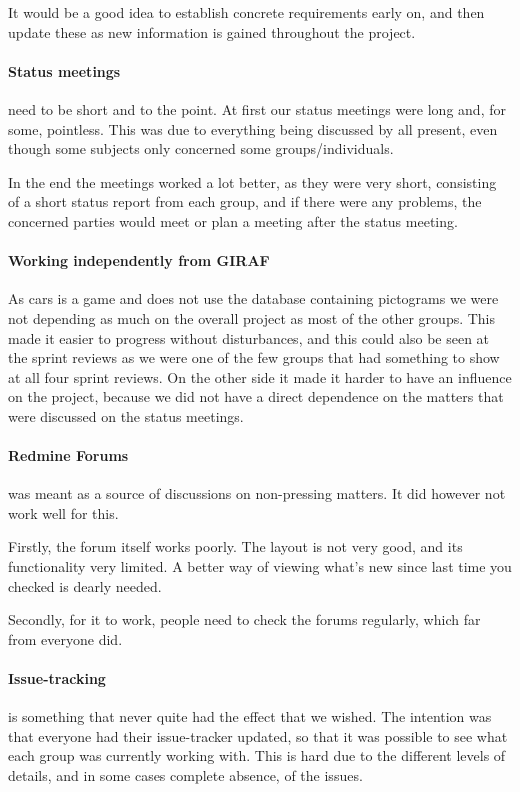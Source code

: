 It would be a good idea to establish concrete requirements early on, and then update these as new information is gained throughout the project.

\paragraph{Status meetings} need to be short and to the point.
At first our status meetings were long and, for some, pointless.
This was due to everything being discussed by all present, even though some subjects only concerned some groups/individuals.

In the end the meetings worked a lot better, as they were very short, consisting of a short status report from each group, and if there were any problems, the concerned parties would meet or plan a meeting after the status meeting.

\paragraph{Working independently from GIRAF}
As cars is a game and does not use the database containing pictograms we were not depending as much on the overall project as most of the other groups.
This made it easier to progress without disturbances, and this could also be seen at the sprint reviews as we were one of the few groups that had something to show at all four sprint reviews.
On the other side it made it harder to have an influence on the project, because we did not have a direct dependence on the matters that were discussed on the status meetings.

\paragraph{Redmine Forums} was meant as a source of discussions on non-pressing matters.
It did however not work well for this.

Firstly, the forum itself works poorly.
The layout is not very good, and its functionality very limited.
A better way of viewing what's new since last time you checked is dearly needed.

Secondly, for it to work, people need to check the forums regularly, which far from everyone did.

\paragraph{Issue-tracking} is something that never quite had the effect that we wished.
The intention was that everyone had their issue-tracker updated, so that it was possible to see what each group was currently working with.
This is hard due to the different levels of details, and in some cases complete absence, of the issues.

